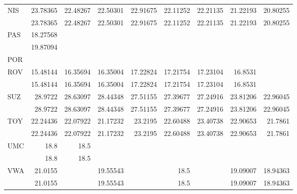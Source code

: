 \begin{tabular}{lrrrrrrrr}
NIS & 23.78365 & 22.48267 & 22.50301 & 22.91675 & 22.11252 & 22.21135 & 21.22193 & 20.80255 \\
 & 23.78365 & 22.48267 & 22.50301 & 22.91675 & 22.11252 & 22.21135 & 21.22193 & 20.80255 \\
PAS & 18.27568 &  &  &  &  &  &  &  \\
 & 19.87094 &  &  &  &  &  &  &  \\
POR &  &  &  &  &  &  &  &  \\
ROV & 15.48144 & 16.35694 & 16.35004 & 17.22824 & 17.21754 & 17.23104 & 16.8531 &  \\
 & 15.48144 & 16.35694 & 16.35004 & 17.22824 & 17.21754 & 17.23104 & 16.8531 &  \\
SUZ & 28.9722 & 28.63097 & 28.44348 & 27.51155 & 27.39677 & 27.24916 & 23.81206 & 22.96045 \\
 & 28.9722 & 28.63097 & 28.44348 & 27.51155 & 27.39677 & 27.24916 & 23.81206 & 22.96045 \\
TOY & 22.24436 & 22.07922 & 21.17232 & 23.2195 & 22.60488 & 23.40738 & 22.90653 & 21.7861 \\
 & 22.24436 & 22.07922 & 21.17232 & 23.2195 & 22.60488 & 23.40738 & 22.90653 & 21.7861 \\
UMC & 18.8 & 18.5 &  &  &  &  &  &  \\
 & 18.8 & 18.5 &  &  &  &  &  &  \\
VWA & 21.0155 &  & 19.55543 &  & 18.5 &  & 19.09007 & 18.94363 \\
 & 21.0155 &  & 19.55543 &  & 18.5 &  & 19.09007 & 18.94363 \\
\bottomrule
\end{tabular}

